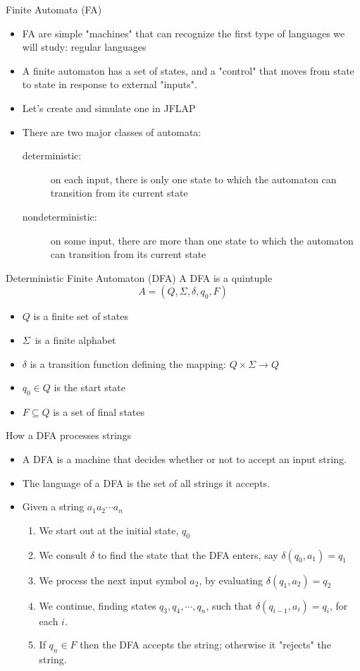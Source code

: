 \documentclass{prosper}%
\newcommand{\sg}{{\mbox{$\Sigma$}}}
\begin{document}
\begin{slide}{Finite Automata (FA)}
\begin{itemize}
\item FA are simple "machines" that can recognize the first type of languages we will study: {\blue regular languages}
\item A finite automaton has a set of states, and a "control" that moves from state to state in response to external "inputs".
\item Let's create and simulate one in JFLAP
\item There are two major classes of automata: 
\begin{description}
\item[deterministic:] on each input, there is only one state to which the automaton can transition from its current state
\item[nondeterministic:] on some input, there are more than one state to which the automaton can transition from its current state
\end{description}
\end{itemize}
\end{slide}

\begin{slide}{Deterministic Finite Automaton (DFA)}
A DFA is a quintuple
\[
A=(Q,\sg,\delta,q_0,F)
\]
\begin{itemize}
\item $Q$ is a finite set of {\blue states}
\item \sg\ is a finite {\blue alphabet} 
\item $\delta$ is a {\blue transition function} defining the mapping: $Q\times\sg\rightarrow Q$
\item $q_0\in Q$ is the {\blue start state}
\item $F\subseteq Q$ is a set of {\blue final}  states
\end{itemize}
\end{slide}

\begin{slide}{How a DFA processes strings}
\begin{itemize}
\item A DFA is a machine that decides whether or not to {\blue accept} an input string.
\item The {\blue language} of a DFA is the set of all strings it accepts.
\item Given a string $a_1a_2\cdots a_n$
\begin{enumerate}
\item We start out at the initial state, $q_0$
\item We consult  $\delta$ to find the state that the DFA enters, say $\delta(q_0,a_1)=q_1$
\item We process the next input symbol $a_2$, by evaluating $\delta(q_1, a_2)=q_2$
\item We continue, finding states $q_3,q_4,\cdots, q_n$, such that $\delta(q_{i-1},a_i)=q_i$, for each $i$.
\item If $q_n\in F$ then the DFA accepts the string; otherwise it "rejects" the string.
\end{enumerate}
\end{itemize}
\end{slide}
\end{document}
